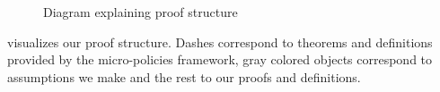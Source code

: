 \begin{figure}[H]
\begin{center}
  \end{center}
\caption{Diagram explaining proof structure}
\label{proof_structure}
\end{figure}

 visualizes our proof structure.
Dashes correspond to theorems and definitions provided by
the micro-policies framework, gray colored objects correspond
to assumptions we make and the rest to our proofs and definitions.





